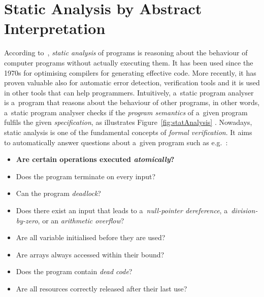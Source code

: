 \section{Static Analysis by Abstract Interpretation}
\label{sec:statAnalysisAI}

According to~\cite{staticAnalysisMoller}, \emph{static analysis} of
programs is reasoning about the behaviour of computer programs without
actually executing them. It has been used since the 1970s for optimising
compilers for generating effective code. More recently, it has proven
valuable also for automatic error detection, verification tools and it
is used in other tools that can help programmers. Intuitively,
a~static program analyser is a~program that reasons about the behaviour
of other programs, in other words, a~static program analyser checks if the
\emph{program semantics} of a~given program fulfils the given
\emph{specification}, as illustrates Figure~\ref{fig:statAnalysis}
\cite{AIBasedFormalMethodsCousot}. Nowadays, static analysis is one of
the fundamental concepts of \emph{formal verification}. It aims to
automatically answer questions about a~given program such as
e.g.~\cite{staticAnalysisMoller}:
\begin{itemize}
    \item
        \textbf{Are certain operations executed \emph{atomically}?}

    \item
        Does the program terminate on every input?

    \item
        Can the program \emph{deadlock}?

    \item
        Does there exist an input that leads to a~\emph{null-pointer
        dereference}, a~\emph{division-by-zero}, or an \emph{arithmetic
        overflow}?

    \item
        Are all variable initialised before they are used?

    \item
        Are arrays always accessed within their bound?

    \item
        Does the program contain \emph{dead code}?

    \item
        Are all resources correctly released after their last
        use?
\end{itemize}

